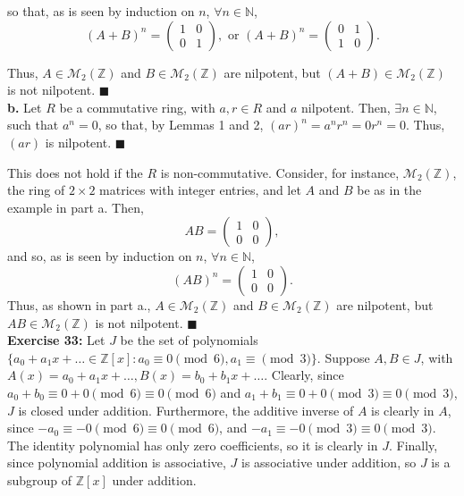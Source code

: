 \documentclass{article}%
\begin{document}
so that, as is seen by induction on $n$, $\forall n \in \mathbb{N}$,
\[(A + B)^n = \left(\begin{array}{cc}
1 & 0 \\
0 & 1 \end{array} \right), \mbox{ or }
(A + B)^n = \left(\begin{array}{cc}
0 & 1 \\
1 & 0 \end{array} \right).
\]

Thus, $A \in \mathcal{M}_2(\mathbb{Z})$ and $B \in \mathcal{M}_2(\mathbb{Z})$
are nilpotent, but $(A + B) \in \mathcal{M}_2(\mathbb{Z})$ is not nilpotent.
\qquad $\blacksquare$ \\

\textbf{b.} Let $R$ be a commutative ring, with $a, r \in R$ and $a$
nilpotent. Then, $\exists n \in \mathbb{N}$, such that $a^n = 0$, so that, by
Lemmas 1 and 2, $(ar)^n = a^nr^n = 0r^n = 0.$ Thus, $(ar)$ is nilpotent.
\qquad $\blacksquare$

This does not hold if the $R$ is non-commutative. Consider, for instance,
$\mathcal{M}_2(\mathbb{Z})$, the ring of $2 \times 2$ matrices with integer
entries, and let $A$ and $B$ be as in the example in part a. Then,
\[AB = \left(\begin{array}{cc}
1 & 0 \\
0 & 0 \end{array} \right),
\]
and so, as is seen by induction on $n$, $\forall n \in \mathbb{N}$,
\[(AB)^n = \left(\begin{array}{cc}
1 & 0 \\
0 & 0 \end{array} \right).
\]
Thus, as shown in part a., $A \in \mathcal{M}_2(\mathbb{Z})$ and $B \in
\mathcal{M}_2(\mathbb{Z})$ are nilpotent, but $AB \in
\mathcal{M}_2(\mathbb{Z})$ is not nilpotent. \qquad $\blacksquare$ \\


\textbf{Exercise 33:} Let $J$ be the set of polynomials
$\{a_0 + a_1x + \ldots \in \mathbb{Z}[x] : a_0 \equiv 0 \pmod 6, a_1 \equiv
\pmod 3\}$. Suppose $A,B \in J$, with $A(x) = a_0 + a_1x + \ldots,
B(x) = b_0 + b_1x + \ldots$. Clearly, since $a_0 + b_0 \equiv 0 + 0 \pmod 6
\equiv 0 \pmod 6$ and $a_1 + b_1 \equiv 0 + 0 \pmod 3 \equiv 0 \pmod 3$,
$J$ is closed under addition. Furthermore, the additive inverse of $A$ is
clearly in $A$, since $-a_0 \equiv -0 \pmod 6 \equiv 0 \pmod 6$, and
$-a_1 \equiv -0 \pmod 3 \equiv 0 \pmod 3$. The identity polynomial has only
zero coefficients, so it is clearly in $J$. Finally, since polynomial addition
is associative, $J$ is associative under addition, so $J$ is a subgroup of
$\mathbb{Z}[x]$ under addition.
\end{document}
